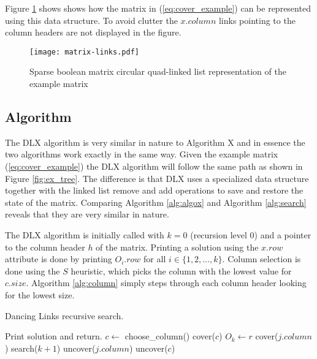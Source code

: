Figure \ref{fig:matrix_links} shows shows how the matrix in (\ref{eq:cover_example}) can be represented using this data structure.
To avoid clutter the $x.column$ links pointing to the column headers are not displayed in the figure.
\begin{figure}[htbp]
	\centering
	\texttt{[image: matrix-links.pdf]}
	\caption{Sparse boolean matrix circular quad-linked list representation of the example matrix}
	\label{fig:matrix_links}
\end{figure}


\subsection{Algorithm}

The DLX algorithm is very similar in nature to Algorithm X and in essence the two algorithms work exactly in the same way.
Given the example matrix (\ref{eq:cover_example}) the DLX algorithm will follow the same path as shown in Figure \ref{fig:ex_tree}.
The difference is that DLX uses a specialized data structure together with the linked list remove and add operations to save and restore the state of the matrix.
Comparing Algorithm \ref{alg:algox} and Algorithm \ref{alg:search} reveals that they are very similar in nature.

The DLX algorithm is initially called with $k = 0$ (recursion level 0) and a pointer to the column header $h$ of the matrix.
Printing a solution using the $x.row$ attribute is done by printing $O_{i}.row$ for all $i \in \{1, 2, \ldots, k\}$.
Column selection is done using the $S$ heuristic, which picks the column with the lowest value for $c.size$.
Algorithm \ref{alg:column} simply steps through each column header looking for the lowest size.

\begin{algorithm}[htbp]
	\caption{Dancing Links recursive search.}
	\label{alg:search}
	\begin{distribalgo}[1]
				\STATE Print solution and return.  
			\ENDIF
			\STATE $c \leftarrow$ choose\_column()
			\STATE cover($c$)
				\STATE $O_k \leftarrow r$  
					\STATE cover($j.column$)
				\ENDFOR
				\STATE search($k + 1$)
					\STATE uncover($j.column$)
				\ENDFOR
			\ENDFOR
			\STATE uncover($c$)
		\ENDPROC
	\end{distribalgo}
\end{algorithm}

